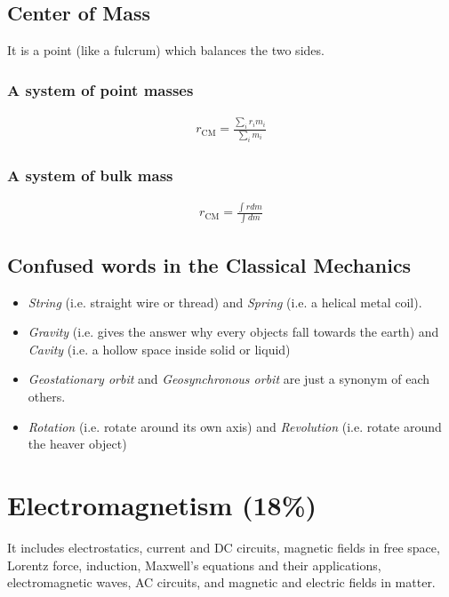 \documentclass[12pt,a4paper]{article}
\begin{document}
\subsection{Center of Mass}
It is a point (like a fulcrum) which balances the two sides.

\subsubsection*{A system of point masses}
\begin{align*}
r_{\text{CM}} = \frac{\sum_{i} r_{i} m_{i}}{\sum_{i} m_{i}}
\end{align*}

\subsubsection*{A system of bulk mass}
\begin{align*}
r_{\text{CM}} = \frac{\int r dm}{\int dm}
\end{align*}
 
\subsection*{Confused words in the Classical Mechanics}

\begin{itemize}
\item \emph{String} (i.e. straight wire or thread) and \emph{Spring} (i.e. a helical metal coil).
\item \emph{Gravity} (i.e. gives the answer why every objects fall towards the earth) and \emph{Cavity} (i.e. a hollow space inside solid or liquid)
\item \emph{Geostationary orbit} and \emph{Geosynchronous orbit} are just a synonym of each others. 
\item \emph{Rotation} (i.e. rotate around its own axis) and \emph{Revolution} (i.e. rotate around the heaver object)
\end{itemize}
\section{Electromagnetism (18\%)}

It includes electrostatics, current and DC circuits, magnetic fields in free space, Lorentz force, induction, Maxwell's equations and their applications, electromagnetic waves, AC circuits, and magnetic and electric fields in matter.
\end{document}
